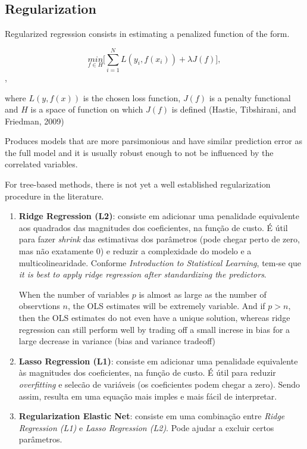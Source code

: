 \subsection{Regularization}
Regularized regression consists in estimating a penalized function of the form.

\begin{equation}
\underset{f \in H}{min} \Big[ \sum_{i = 1}^{N}
L(y_i, f(x_i)) + \lambda J(f) \Big ], 
\end{equation},

where $L(y, f(x))$ is the chosen loss function, $J(f)$ is a penalty functional and $H$ is a space of function on which $J(f)$ is defined (Hastie, Tibshirani, and Friedman, 2009)

Produces models that are more parsimonious and have similar prediction error as the full model and it is usually robust enough to not be influenced by the correlated variables. 
    
For tree-based methods, there is not yet a well established regularization procedure in the literature.

\begin{enumerate}
\item \textbf{Ridge Regression (L2)}: consiste em adicionar uma penalidade equivalente aos quadrados das magnitudes dos coeficientes, na função de custo. É útil para fazer \textit{shrink} das estimativas dos parâmetros (pode chegar perto de zero, mas não exatamente 0) e reduzir a complexidade do modelo e a multicolinearidade. Conforme \textit{Introduction to Statistical Learning}, tem-se que \textit{it is best to apply ridge regression after standardizing the predictors}.

When the number of variables $p$ is almost as large as the number of observtions $n$, the OLS estimates will be extremely variable. And if $p > n$, then the OLS estimates do not even have a unique solution, whereas ridge regression can still perform well by trading off a small increse in bias for a large decrease in variance (bias and variance tradeoff)

\item \textbf{Lasso  Regression (L1)}: consiste em adicionar uma penalidade equivalente às magnitudes dos coeficientes, na função de custo. É útil para reduzir \textit{overfitting} e selecão de variáveis (os coeficientes podem chegar a zero). Sendo assim, resulta em uma equação mais imples e mais fácil de interpretar.

\item \textbf{Regularization Elastic Net}: consiste em uma combinação entre \textit{Ridge Regression (L1)} e \textit{Lasso Regression (L2)}. Pode ajudar a excluir certos parâmetros.
\end{enumerate}

